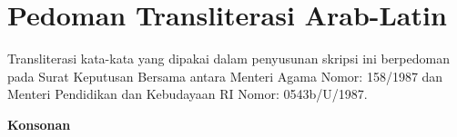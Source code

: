 %
%
%
\chapter*{Pedoman Transliterasi Arab-Latin}

%

Transliterasi kata-kata yang dipakai dalam penyusunan skripsi ini berpedoman
pada Surat Keputusan Bersama antara Menteri Agama Nomor: 158/1987 dan Menteri Pendidikan dan Kebudayaan RI Nomor: 0543b/U/1987.

\textbf{Konsonan}

